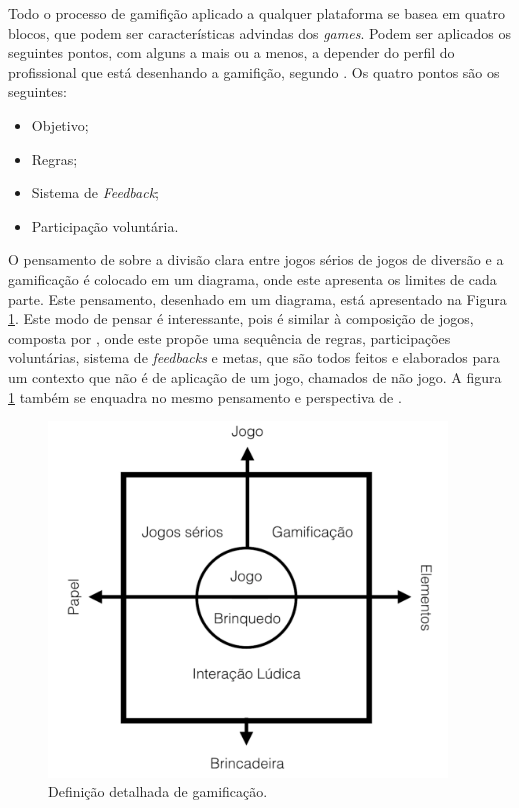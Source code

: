 Todo o processo de gamifição aplicado a qualquer plataforma se basea em
quatro blocos, que podem ser características advindas dos \textit{games}. Podem ser
aplicados os seguintes pontos, com alguns a mais ou a menos, a depender
do perfil do profissional que está desenhando a gamifição, segundo \cite{mcgonigal2011reality}.
Os quatro pontos são os seguintes:

\begin{itemize}
    \item Objetivo;
    \item Regras;
    \item Sistema de \textit{Feedback};
    \item Participação voluntária.
\end{itemize}

O pensamento de \cite{deterding2011gamification}  sobre a divisão clara entre jogos sérios
de jogos de diversão e a gamificação é colocado em um diagrama, onde este
apresenta os limites de cada parte. Este pensamento, desenhado em um diagrama,
está apresentado na Figura \ref{fig:gamificacaodetalhada}. Este modo de pensar é interessante, pois
é similar à composição de jogos, composta por \cite{mcgonigal2011reality}, onde este
propõe uma sequência de regras, participações voluntárias, sistema de
\textit{feedbacks} e metas, que são todos feitos e elaborados para um contexto que
não é de aplicação de um jogo, chamados de não jogo. A figura \ref{fig:gamificacaodetalhada}
também se enquadra no mesmo pensamento e perspectiva de \cite{mcgonigal2011reality}.

\begin{figure}[h]
    \centering
    \includegraphics[width=400px, scale=1]{figuras/gamificacaodetalhada}
    \caption{Definição detalhada de gamificação. }
    \label{fig:gamificacaodetalhada}
\end{figure}


